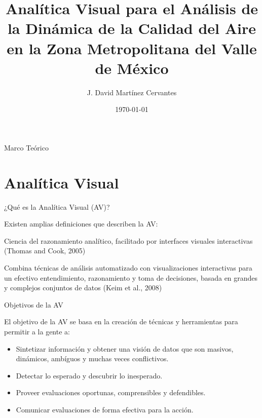 \documentclass[aspectratio=169,xcolor=dvipsnames]{beamer}
\title[short title]{Analítica Visual para el Análisis de la Dinámica de la Calidad del Aire en la Zona Metropolitana del Valle de México}
\subtitle{}
\author[David Martínez] {J. David Martínez Cervantes}
\institute[CentroGeo] %
{
    Centro de Investigación en Ciencias de Información Geoespacial
    \vskip 3pt
}
\date{\today} %
\begin{document}
\begin{frame}
    \titlepage
\end{frame}

\begin{frame}{Marco Teórico}
    \tableofcontents
\end{frame}

\section{Analítica Visual}

\begin{frame}{¿Qué es la Analítica Visual (AV)?}

Existen amplias definiciones que describen la AV: 

    \begin{block}{}
        Ciencia del razonamiento analítico, facilitado por interfaces visuales interactivas (Thomas and Cook, 2005)
    \end{block}
    
    \begin{block}{}
        Combina técnicas de análisis automatizado con visualizaciones interactivas para un efectivo entendimiento, razonamiento y toma de decisiones, basada en grandes y complejos conjuntos de datos (Keim et al., 2008)
    \end{block}

\end{frame}


\begin{frame}{Objetivos de la AV}

El objetivo de la AV se basa en la creación de técnicas y herramientas para permitir a la gente a:

    \begin{itemize}
        \item Sintetizar información y obtener una visión de datos que son masivos, dinámicos, ambíguos y muchas veces conflictivos.
        \item Detectar lo esperado y descubrir lo inesperado.
        \item Proveer evaluaciones oportunas, comprensibles y defendibles.
        \item Comunicar evaluaciones de forma efectiva para la acción.
    \end{itemize}
    
\end{frame}
\end{document}
